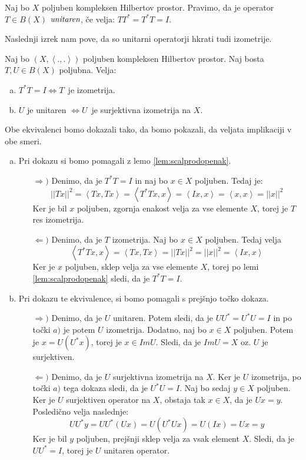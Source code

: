 \documentclass[mat2]{matdelo}
\newcommand{\abs}[1]{\ensuremath{\lvert #1 \rvert}}
\newcommand{\norm}[1]{\abs{\abs{#1}}}
\newcommand{\pojem}[1]{\ensuremath{\emph{#1}}}
\newcommand{\Sp}[2]{\ensuremath{\left<#1, #2\right>}}
\begin{document}
			\begin{definicija}
				\label{def:unitarop}
				Naj bo $X$ poljuben kompleksen Hilbertov prostor. Pravimo, da je operator $T\in B(X)$ \pojem{unitaren}, če velja: $TT^* = T^*T = I$.
			\end{definicija}
			Naslednji izrek nam pove, da so unitarni operatorji hkrati tudi izometrije.
			\begin{izrek}
				\label{izr:uniizo}
				Naj bo $(X, \Sp{.}{.})$ poljuben kompleksen Hilbertov prostor. Naj bosta $T, U\in B(X)$ poljubna. Velja: \begin{enumerate}[a)]
					\item $T^*T = I \iff T$~je izometrija.
					\item $U$ je unitaren $\iff U$~je surjektivna izometrija na $X$.
				\end{enumerate}
			\end{izrek}
			\begin{dokaz}
				Obe ekvivalenci bomo dokazali tako, da bomo pokazali, da veljata implikaciji v obe smeri.
				\begin{enumerate}[a)]
					\item Pri dokazu si bomo pomagali z lemo \ref{lem:scalprodopenak}. \begin{itemize}
						\item[$\Rightarrow)$] Denimo, da je $T^*T = I$ in naj bo $x\in X$ poljuben. Tedaj je: $$\norm{Tx}^2=\Sp{Tx}{Tx} = \Sp{T^*Tx}{x}= \Sp{Ix}{x} = \Sp{x}{x} = \norm{x}^2$$
						Ker je bil $x$ poljuben, zgornja enakost velja za vse elemente $X$, torej je $T$ res izometrija.
						\item[$\Leftarrow)$] Denimo, da je $T$ izometrija. Naj bo $x\in X$ poljuben. Tedaj velja $$\Sp{T^*Tx}{x} = \Sp{Tx}{Tx} = \norm{Tx}^2 = \norm{x}^2 = \Sp{Ix}{x}$$
						Ker je $x$ poljuben, sklep velja za vse elemente $X$, torej po lemi \ref{lem:scalprodopenak} sledi, da je $T^*T = I$.
					\end{itemize}
					\item Pri dokazu te ekvivalence, si bomo pomagali s prejšnjo točko dokaza.  \begin{itemize}
						\item[$\Rightarrow)$] Denimo, da je $U$ unitaren. Potem sledi, da je $UU^*=U^*U = I$ in po točki $a)$ je potem $U$ izometrija. Dodatno, naj bo $x\in X$ poljuben. Potem je $x = U(U^*x)$, torej je $x\in ImU$. Sledi, da je $ImU = X$ oz. $U$ je surjektiven.
						\item[$\Leftarrow)$] Denimo, da je $U$ surjektivna izometrija na $X$. Ker je $U$ izometrija, po točki $a)$ tega dokaza sledi, da je $U^*U = I$. Naj bo sedaj $y\in X$ poljuben. Ker je $U$ surjektiven operator na $X$, obstaja tak $x\in X$, da je $Ux = y$. Posledično velja naslednje: $$UU^*y = UU^*(Ux) = U(U^*Ux) = U(Ix) = Ux = y$$
						Ker je bil $y$ poljuben, prejšnji sklep velja za vsak element $X$. Sledi, da je $UU^* = I$, torej je $U$ unitaren operator.
					\end{itemize}
				\end{enumerate}
			\end{dokaz}
\end{document}
